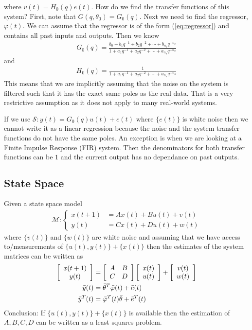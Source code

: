 where $v(t)=H_0(q)e(t)$.
How do we find the transfer functions of this system? First, note that $G(q,\theta_0)=G_0(q)$.
Next we need to find the regressor, $\varphi(t)$.
We can assume that the regressor is of the form (\ref{eq:regressor}) and contains all past inputs and outputs.
Then we know
\begin{align}
\label{eq:g}
G_0(q) = \frac{b_0+b_1q^{-1}+b_2q^{-2}+\cdots+b_{n_b}q^{-n_b}}{1+a_1q^{-1}+a_2q^{-2}+\cdots+a_{n_a}q^{-n_a}}
\end{align}
and
\begin{align}
\label{eq:h}
H_0(q) = \frac{1}{1+a_1q^{-1}+a_2q^{-2}+\cdots+a_{n_a}q^{-n_a}}
\end{align}
This means that we are implicitly assuming that the noise on the system is filtered such that it has the exact same poles as the real data.
That is a very restrictive assumption as it does not apply to many real-world systems.

If we use $\mathcal{S}: y(t) = G_0(q)u(t) + e(t)$ where $\{e(t)\}$ is white noise then we cannot write it as a linear regression because the noise and the system transfer functions do not have the same poles.
An exception is when we are looking at a Finite Impulse Response (FIR) system.
Then the denominators for both transfer functions can be $1$ and the current output has no dependance on past outputs.

\subsection{State Space}
Given a state space model
\begin{align*}
\mathcal{M}: \begin{cases} x(t+1)&=Ax(t)+Bu(t)+v(t) \\ y(t)&=Cx(t)+Du(t)+w(t) \end{cases}
\end{align*}
where $\{v(t)\}$ and $\{w(t)\}$ are white noise and assuming that we have access to/measurements of $\{u(t),y(t)\} + \{x(t)\}$ then the estimates of the system matrices can be written as
\begin{align}
\left[\begin{array}{c} x(t+1) \\ y(t) \end{array}\right] &=
\left[\begin{array}{c c} A & B \\ C & D \end{array}\right] \left[\begin{array}{c} x(t) \\ u(t) \end{array}\right] +
\left[\begin{array}{c} v(t) \\ w(t) \end{array}\right] \nonumber\\
\bar{y} (t) &= \bar{\theta}^T\bar{\varphi} (t) + \bar{e} (t) \nonumber\\
\bar{y}^T (t) &= \bar{\varphi}^T (t)\bar{\theta} + \bar{e}^T (t)
\end{align}
Conclusion: If $\{u(t),y(t)\} + \{x(t)\}$ is available then the estimation of $A,B,C,D$ can be written as a least squares problem.

